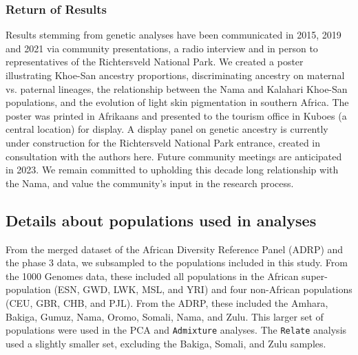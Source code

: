 \documentclass[]{article}
\begin{document}
\subsubsection{Return of Results}

Results stemming from genetic analyses have been communicated in 2015, 2019 and
2021 via community presentations, a radio interview and in person to
representatives of the Richtersveld National Park. We created a poster
illustrating Khoe-San ancestry proportions, discriminating ancestry on maternal
vs. paternal lineages, the relationship between the Nama and Kalahari Khoe-San
populations, and the evolution of light skin pigmentation in southern Africa.
The poster was printed in Afrikaans and presented to the tourism office in
Kuboes (a central location) for display. A display panel on genetic ancestry is
currently under construction for the Richtersveld National Park entrance,
created in consultation with the authors here. Future community meetings are
anticipated in 2023. We remain committed to upholding this decade long
relationship with the Nama, and value the community’s input in the research
process.


\subsection{Details about populations used in analyses}
\label{sec:populations-used}

From the merged dataset of the African Diversity Reference Panel (ADRP)
\citep{Gurdasani2015-qy,Pagani2015-pz}
and the \citet{1000_Genomes_Project_Consortium2015-zq} phase 3 data,
we subsampled to the populations included in this study. From the 1000 Genomes
data, these included all populations in the African super-population (ESN, GWD,
LWK, MSL, and YRI) and four non-African populations (CEU, GBR, CHB, and PJL).
From the ADRP, these included the Amhara, Bakiga, Gumuz, Nama, Oromo, Somali,
Nama, and Zulu. This larger set of populations were used in the PCA and
\texttt{Admixture} analyses. The \texttt{Relate} analysis used a slightly
smaller set, excluding the Bakiga, Somali, and Zulu samples.
\end{document}
